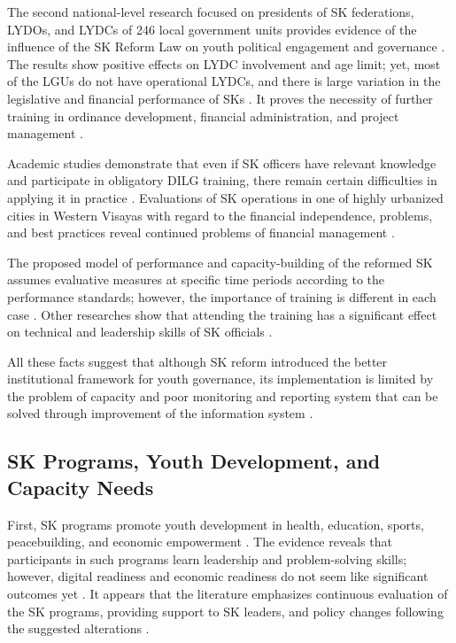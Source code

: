 \hspace*{\parindent}The second national-level research focused on presidents of SK federations, LYDOs, and LYDCs of 246 local government units provides evidence of the influence of the SK Reform Law on youth political engagement and governance \cite{T}. The results show positive effects on LYDC involvement and age limit; yet, most of the LGUs do not have operational LYDCs, and there is large variation in the legislative and financial performance of SKs \cite{T}. It proves the necessity of further training in ordinance development, financial administration, and project management \cite{T}.
\vspace{5mm}

\hspace*{\parindent}Academic studies demonstrate that even if SK officers have relevant knowledge and participate in obligatory DILG training, there remain certain difficulties in applying it in practice \cite{B}. Evaluations of SK operations in one of highly urbanized cities in Western Visayas with regard to the financial independence, problems, and best practices reveal continued problems of financial management \cite{AY}.
\vspace{5mm}

\hspace*{\parindent}The proposed model of performance and capacity-building of the reformed SK assumes evaluative measures at specific time periods according to the performance standards; however, the importance of training is different in each case \cite{K}. Other researches show that attending the training has a significant effect on technical and leadership skills of SK officials \cite{B,K}.
\vspace{5mm}

\hspace*{\parindent}All these facts suggest that although SK reform introduced the better institutional framework for youth governance, its implementation is limited by the problem of capacity and poor monitoring and reporting system that can be solved through improvement of the information system \cite{I,J,K,S,T,AB,AR}.
\vspace{5mm}

\subsection{SK Programs, Youth Development, and Capacity Needs}

\hspace*{\parindent}First, SK programs promote youth development in health, education, sports, peacebuilding, and economic empowerment \cite{AP}. The evidence reveals that participants in such programs learn leadership and problem-solving skills; however, digital readiness and economic readiness do not seem like significant outcomes yet \cite{AP}. It appears that the literature emphasizes continuous evaluation of the SK programs, providing support to SK leaders, and policy changes following the suggested alterations \cite{AP}.
\vspace{5mm}

